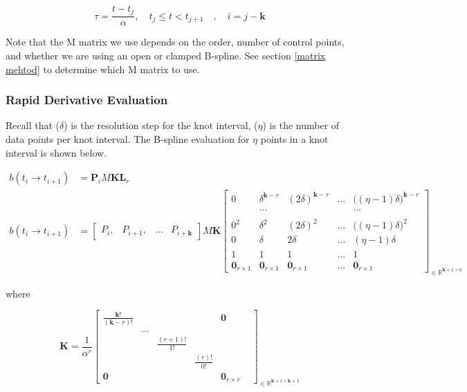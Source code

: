 \documentclass{article}
\begin{document}
    \begin{equation}
        \tau = \frac{t-t_j}{\alpha}, \quad t_j \leq t < t_{j+1} \quad , \quad i = j-\textbf{k}
    \end{equation}


Note that the M matrix we use depends on the order, number of control points, and whether we are using an open or clamped B-spline. See section \ref{matrix mehtod} to determine which M matrix to use.

\subsubsection{Rapid Derivative Evaluation}

Recall that (\(\delta\)) is the resolution step for the knot interval, (\(\eta\)) is the number of data points per knot interval. The B-spline evaluation for \(\eta\) points in a knot interval is shown below.

\begin{equation}
\begin{aligned}
    b(t_i \rightarrow t_{i+1}) &= \textbf{P}_i M \textbf{K}\textbf{L}_r\\
    b(t_i \rightarrow t_{i+1}) &= \begin{bmatrix} P_i, & P_{i+1}, & ... & P_{i+\textbf{k}} \end{bmatrix} M \textbf{K} \begin{bmatrix} 0 & \delta^{\textbf{k}-r} & (2\delta)^{\textbf{k}-r}& ... & \big((\eta-1) \delta\big)^{\textbf{k}-r}\\
    & ... & & & ... \\ \\
    0^2 &  \delta^2 & (2\delta)^2 & ... & \big((\eta-1) \delta\big)^2 \\ 
     0 &  \delta & 2\delta & ... & (\eta-1) \delta \\ 
     1 & 1 & 1 & ... & 1 \\
     \textbf{0}_{r \times 1} & \textbf{0}_{r \times 1} & \textbf{0}_{r \times 1} & ... & \textbf{0}_{r \times 1}\end{bmatrix}_{\in \mathbb{R}^{\textbf{k}+1 \times \eta}}
\end{aligned}
\end{equation}

where

\begin{equation}
    \textbf{K} = \frac{1}{\alpha^r}\begin{bmatrix} \frac{\textbf{k}!}{(\textbf{k}-r)!} & & & &  \textbf{0}\\ 
    & ... & & & & 
    \\ 
    & &  \frac{(r+1)!}{1!} & &
    \\  & & & \frac{(r)!}{0!} &
    \\ \textbf{0} &  & & & \textbf{0}_{r \times r} \end{bmatrix}_{\in \mathbb{R}^{\textbf{k}+1 \times \textbf{k}+1}}
\end{equation}
\end{document}
